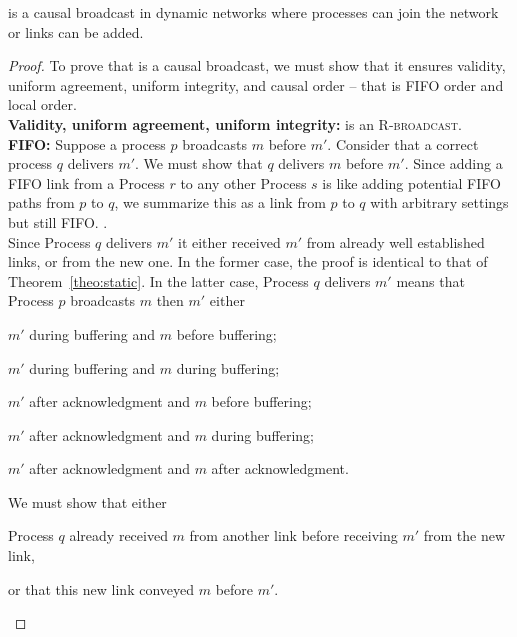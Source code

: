 \begin{lemma}
  \CBROADCAST is a causal broadcast in dynamic networks where processes can join
  the network or links can be added.
\end{lemma}

\begin{proof}
  To prove that \CBROADCAST is a causal broadcast, we must show that it ensures
  validity, uniform agreement, uniform integrity, and causal order -- that is
  FIFO order and local order. \\
  \textbf{Validity, uniform agreement, uniform integrity:} \CBROADCAST is an
  \textsc{R-broadcast}. \\
  \textbf{FIFO:} Suppose a process $p$ broadcasts $m$ before $m'$. Consider that
  a correct process $q$ delivers $m'$. We must show that $q$ delivers $m$ before
  $m'$.  Since adding a FIFO link from a Process $r$ to any other Process $s$ is
  like adding potential FIFO paths from $p$ to $q$, we summarize this as a link
  from $p$ to $q$ with arbitrary settings but still FIFO.  . \\
  Since Process $q$ delivers $m'$ it either received $m'$ from already well
  established links, or from the new one. In the former case, the proof is
  identical to that of Theorem~\ref{theo:static}. In the latter case, Process
  $q$ delivers $m'$ means that Process $p$ broadcasts $m$ then $m'$ either
  \begin{inparaenum}[(i)]
  \item \label{case:one} $m'$ during buffering and $m$ before buffering;
  \item \label{case:two} $m'$ during buffering and $m$ during buffering;
  \item \label{case:three} $m'$ after acknowledgment and $m$ before buffering;
  \item \label{case:four} $m'$ after acknowledgment and $m$ during buffering;
  \item \label{case:five} $m'$ after acknowledgment and $m$ after acknowledgment.
  \end{inparaenum}
  We must show that either 
  \begin{inparaenum}[(1)]
  \item \label{show:one} Process $q$ already received $m$ from another link
    before receiving $m'$ from the new link,
  \item \label{show:two} or that this new link conveyed $m$ before $m'$.
  \end{inparaenum}


\end{proof}
